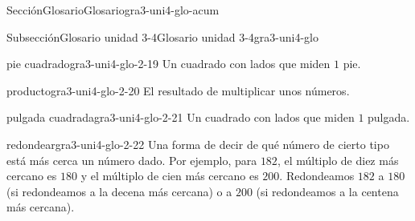 \documentclass[twoside,10pt,]{article}
\begin{document}
\begin{sectionptx}{Sección}{Glosario}{}{Glosario}{}{}{gra3-uni4-glo-acum}
\begin{subsectionptx}{Subsección}{Glosario unidad 3-4}{}{Glosario unidad 3-4}{}{}{gra3-uni4-glo}
\begin{descriptionlist}
\begin{dlimedium}{pie cuadrado}{gra3-uni4-glo-2-19}
Un cuadrado con lados que miden \(1\) pie.%
\end{dlimedium}%
\begin{dlimedium}{producto}{gra3-uni4-glo-2-20}%
El resultado de multiplicar unos números.%
\end{dlimedium}%
\begin{dlimedium}{pulgada cuadrada}{gra3-uni4-glo-2-21}%
Un cuadrado con lados que miden \(1\) pulgada.%
\end{dlimedium}%
\begin{dlimedium}{redondear}{gra3-uni4-glo-2-22}%
Una forma de decir de qué número de cierto tipo está más cerca un número dado. Por ejemplo, para \(182\), el múltiplo de diez más cercano es \(180\) y el múltiplo de cien más cercano es \(200\). Redondeamos \(182\) a \(180\) (si redondeamos a la decena más cercana) o a \(200\) (si redondeamos a la centena más cercana).%
\end{dlimedium}%
\end{descriptionlist}
\end{subsectionptx}
\end{sectionptx}
%
%
\typeout{************************************************}
\typeout{************************************************}
%
\end{document}
